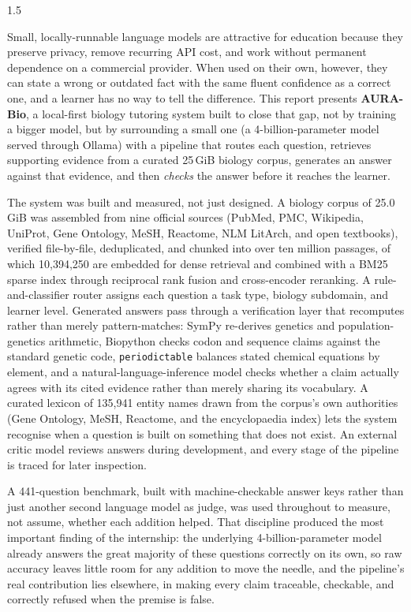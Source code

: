 \begin{spacing}{1.5}

Small, locally-runnable language models are attractive for education because
they preserve privacy, remove recurring API cost, and work without permanent
dependence on a commercial provider. When used on their own, however, they can
state a wrong or outdated fact with the same fluent confidence as a correct
one, and a learner has no way to tell the difference. This report presents
\textbf{AURA-Bio}, a local-first biology tutoring system built to close that
gap, not by training a bigger model, but by surrounding a small one
(a 4-billion-parameter model served through Ollama) with a pipeline that
routes each question, retrieves supporting evidence from a curated
25\,GiB biology corpus, generates an answer against that evidence, and then
\emph{checks} the answer before it reaches the learner.

The system was built and measured, not just designed. A biology corpus of
25.0\,GiB was assembled from nine official sources (PubMed, PMC, Wikipedia,
UniProt, Gene Ontology, MeSH, Reactome, NLM LitArch, and open textbooks),
verified file-by-file, deduplicated, and chunked into over ten million
passages, of which 10,394,250 are embedded for dense retrieval and combined
with a BM25 sparse index through reciprocal rank fusion and cross-encoder
reranking. A rule-and-classifier router assigns each question a task type,
biology subdomain, and learner level. Generated answers pass through a
verification layer that recomputes rather than merely pattern-matches:
SymPy re-derives genetics and population-genetics arithmetic, Biopython
checks codon and sequence claims against the standard genetic code,
\texttt{periodictable} balances stated chemical equations by element, and a
natural-language-inference model checks whether a claim actually agrees with
its cited evidence rather than merely sharing its vocabulary. A curated
lexicon of 135,941 entity names drawn from the corpus's own authorities
(Gene Ontology, MeSH, Reactome, and the encyclopaedia index) lets the system
recognise when a question is built on something that does not exist. An
external critic model reviews answers during development, and every stage of
the pipeline is traced for later inspection.

A 441-question benchmark, built with machine-checkable answer keys rather
than just another second language model as judge, was used throughout to
measure, not assume, whether each addition helped. That discipline
produced the most important finding of the internship: the underlying
4-billion-parameter model already answers the great majority of these
questions correctly on its own, so raw accuracy leaves little room for any
addition to move the needle, and the pipeline's real contribution lies
elsewhere, in making every claim traceable, checkable, and correctly
refused when the premise is false.


\end{spacing}
